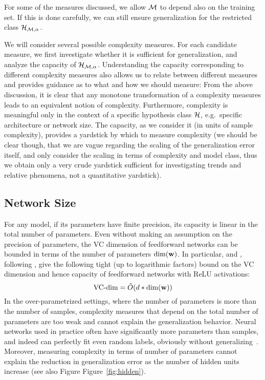 \documentclass{article}
\begin{document}
For some of the measures discussed, we allow $\mathcal{M}$ to depend also on
the training set.  If this is done carefully, we can still ensure
generalization for the restricted class $\mathcal{H}_{\mathcal{M},\alpha}$.

We will consider several possible complexity measures.  For each
candidate measure, we first investigate whether it is sufficient for
generalization, and analyze the capacity of $\mathcal{H}_{\mathcal{M},\alpha}$.
Understanding the capacity corresponding to different complexity
measures also allows us to relate between different measures and
provides guidance as to what and how we should measure: From the above
discussion, it is clear that any monotone transformation of a
complexity measures leads to an equivalent notion of complexity.
Furthermore, complexity is meaningful only in the context of a
specific hypothesis class $\mathcal{H}$, e.g.~specific architecture or
network size.  The capacity, as we consider it (in units of sample
complexity), provides a yardstick by which to measure complexity (we
should be clear though, that we are vague regarding the scaling of the
generalization error itself, and only consider the scaling in terms of
complexity and model class, thus we obtain only a very crude yardstick
sufficient for investigating trends and relative phenomena, not a
quantitative yardstick).

\subsection{Network Size}
For any model, if its parameters have finite precision, its capacity
is linear in the total number of parameters. Even without making an
assumption on the precision of parameters, the VC dimension of
feedforward networks can be bounded in terms of the number of
parameters 
$\text{dim}(\mathbf{w})$\cite{anthony2009neural,bartlett1998sample,bartlett1998almost,
  shalev2014understanding}. In particular, \citet{bartlet2017} and
\citet{harvey2017nearly}, following \citet{bartlett1998almost}, give the following tight
(up to logarithmic factors) bound on the VC
dimension and hence capacity of feedforward networks with ReLU activations:
\begin{equation}
\text{VC-dim} = \tilde{O}(d * \text{dim}(\mathbf{w}))
\end{equation}
In the over-parametrized settings, where the number of parameters is
more than the number of samples, complexity measures that depend on
the total number of parameters are too weak and cannot explain the
generalization behavior.  Neural networks used in practice often have
significantly more parameters than samples, and indeed can perfectly
fit even random labels, obviously without
generalizing~\cite{zhang2017understanding}.  Moreover, measuring
complexity in terms of number of parameters cannot explain the
reduction in generalization error as the number of hidden units
increase \cite{neyshabur15b} (see also Figure
Figure~\ref{fig:hidden}).
\end{document}
